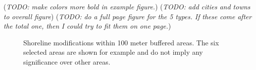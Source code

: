 \documentclass[12pt]{article}\usepackage[]{graphicx}\usepackage[]{color}
\begin{document}
(\emph{TODO: make colors more bold in example figure.}) (\emph{TODO: add cities and towns to overall figure}) (\emph{TODO: do a full page figure for the 5 types. If these come after the total one, then I could try to fit them on one page.})
\begin{figure}[H]

{\centering {} 

}

\caption{Shoreline modifications within 100 meter buffered areas. The six selected areas are shown for example and do not imply any significance over other areas.}\label{fig:exampleareas}
\end{figure}
\end{document}
